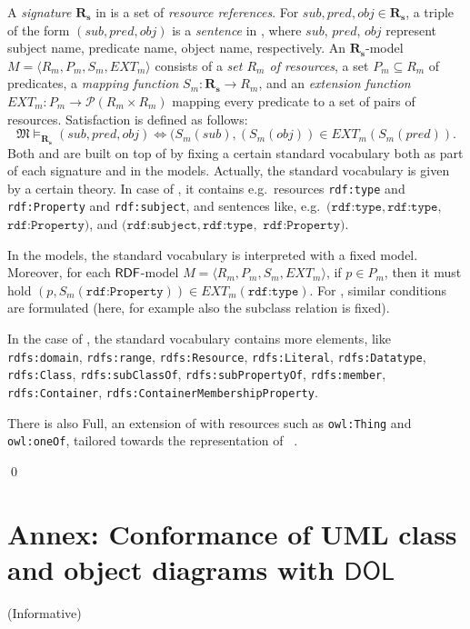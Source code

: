 \documentclass[10pt,fleqn,final]{scrreprt}
\newcommand*{\DOL}{\ensuremath{\mathsf{DOL}}\xspace}
\newcommand{\informative}[0]{{\begin{center}{\Large{(Informative})}\end{center}} \bigskip}
\newcommand{\infannex}[1]{ \chapter{Annex: #1}  \informative }
\newenvironment{definitions}[0]{\medskip }{}
\begin{document}
\begin{definitions}
\begin{definition}
A \textit{signature} $\mathbf{R_s}$ in \SimpleRDF is a set of
\textit{resource references}. For $sub, pred, obj \in \mathbf{R_s}$, a
triple of the form $(sub, pred, obj)$ is a \textit{sentence} in \SimpleRDF,
where $sub$, $pred$, $obj$ represent subject name, predicate name,
object name, respectively. An $\mathbf{R_s}$-model $M =
\langle R_m, P_m, S_m, EXT_m \rangle$ consists of a \textit{set $R_m$
  of resources}, a set $P_m \subseteq R_m$ of predicates, a
\textit{mapping function} $S_m:\mathbf{R_s} \rightarrow R_m$, and an
\textit{extension function} $EXT_m: P_m \rightarrow \mathcal{P}(R_m
\times R_m)$ mapping every predicate to a set of pairs of
resources. Satisfaction is defined as follows:
%
\[\mathfrak{M} \models_{\mathbf{R_s}} (sub, pred, obj) \Leftrightarrow (S_{m}(sub),
(S_{m}(obj)) \in EXT_{m} (S_m(pred)). \]
%
Both \RDF and \RDFS are built on top of \SimpleRDF by fixing a certain
standard vocabulary both as part of each signature and in the models.
Actually, the standard vocabulary is given by a certain theory. In case
of \RDF, it contains e.g.\ resources \texttt{rdf:type} and
\texttt{rdf:Property} and \texttt{rdf:subject}, and sentences like, e.g.\
$(\texttt{rdf:type},\texttt{rdf:type},$ $ \texttt{rdf:Property})$, and $(\texttt{rdf:subject}, \texttt{rdf:type},$  $\texttt{rdf:Property})$.

In the models, the standard vocabulary is interpreted with a fixed
model.  Moreover, for each $\mathsf{RDF}$-model $M = \langle R_m, P_m, S_m,
EXT_m \rangle$, if $p\in P_m$, then it must hold
$(p,S_m(\texttt{rdf:Property}))\in EXT_m(\texttt{rdf:type})$.
For \RDFS, similar conditions are formulated (here, for example also
the subclass relation is fixed).


In the case of \RDFS, the standard vocabulary contains more elements,
like
\texttt{rdfs:domain},
\texttt{rdfs:range}, \texttt{rdfs:Resource}, \texttt{rdfs:Literal}, \texttt{rdfs:Datatype}, \texttt{rdfs:Class},
\texttt{rdfs:subClassOf}, \texttt{rdfs:subPropertyOf}, \texttt{rdfs:member}, \texttt{rdfs:Container},
\texttt{rdfs:ContainerMembershipProperty}.

There is also \OWL Full, an extension of \RDFS with resources
such as \texttt{owl:Thing} and \texttt{owl:oneOf}, tailored towards the representation of
\OWL~\cite{W3C:REC-owl2-rdf-based-semantics-20091027}.

\qed\end{definition}


\infannex{Conformance of UML class and object diagrams with \DOL}\label{a:uml-class}


\end{definitions}
\end{document}
